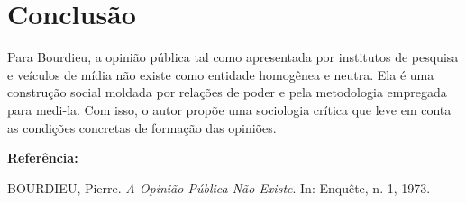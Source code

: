 \documentclass[12pt]{article}
\begin{document}
\section*{Conclusão}

Para Bourdieu, a opinião pública tal como apresentada por institutos de pesquisa e veículos de mídia não existe como entidade homogênea e neutra. Ela é uma construção social moldada por relações de poder e pela metodologia empregada para medi-la. Com isso, o autor propõe uma sociologia crítica que leve em conta as condições concretas de formação das opiniões.

\vspace{1em}
\noindent\textbf{Referência:}

BOURDIEU, Pierre. \textit{A Opinião Pública Não Existe}. In: Enquête, n. 1, 1973.
\end{document}

